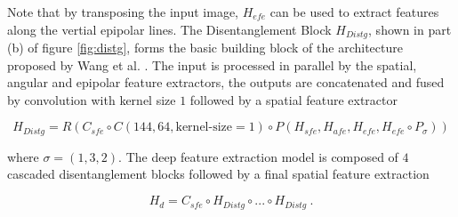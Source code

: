 Note that by transposing the input image, $H_{efe}$ can be used to extract features along the vertial epipolar lines.
The Disentanglement Block $H_{Distg}$, shown in part (b) of figure \ref{fig:distg}, forms the basic building block of the architecture proposed by Wang et al. \cite{wangDisentanglingLightFields2023}.
The input is processed in parallel by the spatial, angular and epipolar feature extractors,
the outputs are concatenated and fused by convolution with kernel size $1$ followed by a spatial feature extractor

\begin{equation}
    \label{eq:distgBlock}
    H_{Distg} = R(C_{sfe} \circ C(144, 64, \text{kernel-size}=1) \circ P(H_{sfe}, H_{afe}, H_{efe}, H_{efe} \circ P_\sigma))
\end{equation}

where $\sigma = (1, 3, 2)$.
The deep feature extraction model is composed of $4$ cascaded disentanglement blocks followed by a final spatial feature extraction

    $$ H_d = C_{sfe} \circ H_{Distg} \circ ... \circ H_{Distg} ~. $$